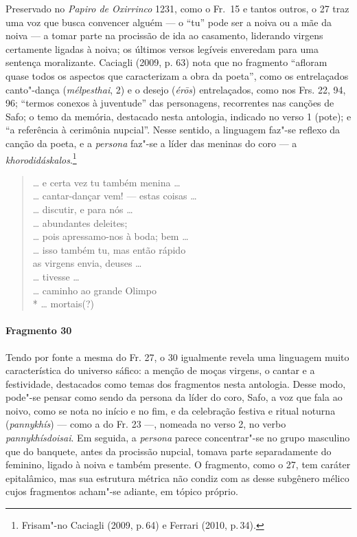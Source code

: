 {{\small Preservado no \textit{Papiro de Oxirrinco} 1231, como o Fr.~15 e tantos outros, o 27 traz uma voz que busca convencer alguém  --- o ``tu''
pode ser a noiva ou a mãe da noiva --- a tomar parte na procissão de
ida ao casamento, liderando virgens certamente ligadas à noiva; os últimos versos
legíveis enveredam para uma sentença moralizante.
Caciagli (2009, p. 63) nota que no fragmento “afloram quase todos os aspectos que caracterizam a obra da poeta'', como os entrelaçados canto"-dança (\textit{mélpesthai}, 2) e o desejo (\textit{érōs}) entrelaçados, como nos Frs. 22, 94, 96; ``termos conexos à juventude'' das personagens, recorrentes nas canções de Safo; o temo da memória, destacado nesta antologia, indicado no verso 1 (pote); e ``a referência à cerimônia nupcial''. Nesse sentido, a linguagem faz"-se reflexo da canção da poeta, e a \textit{persona} faz"-se a líder das meninas do coro --- a \textit{khorodidáskalos}.\footnote{Frisam"-no Caciagli (2009, p.\,64) e Ferrari (2010, p.\,34).}}

\begin{verse}
\ldots{} e certa vez tu também menina \ldots{}\\
\ldots{} cantar-dançar vem! --- estas coisas \ldots{}\\
\ldots{} discutir, e para nós \ldots{}\\
\ldots{} abundantes deleites;\\
\ldots{} pois apressamo-nos à boda; bem \ldots{}\\
\ldots{} isso também tu, mas então rápido\\
as virgens envia, deuses \ldots{}\\
\ldots{} tivesse \ldots{}\\
\ldots{} caminho ao grande Olimpo\\*
\ldots{} mortais(?)
\end{verse}

\paragraph{Fragmento 30}

{\small Tendo por fonte a mesma do Fr. 27, o 30 igualmente revela uma linguagem muito característica do universo sáfico: a menção de moças virgens, o cantar e a festividade, destacados como temas dos fragmentos nesta antologia. Desse modo, pode"-se pensar como sendo da persona da líder do coro, Safo, a
voz que fala ao noivo, como se nota no início e no fim, e da celebração
festiva e ritual noturna (\textit{pannykhís}) --- como a do Fr. 23 ---, nomeada no verso 2, no verbo \textit{pannykhísdoisai}. Em seguida, a \textit{persona} parece concentrar"-se no grupo masculino que do
banquete, antes da procissão nupcial, tomava parte separadamente do feminino,
ligado à noiva e também presente. O fragmento, como o 27, tem caráter
epitalâmico, mas sua estrutura métrica não condiz com as desse subgênero
mélico cujos fragmentos acham"-se adiante, em tópico próprio.}

}
